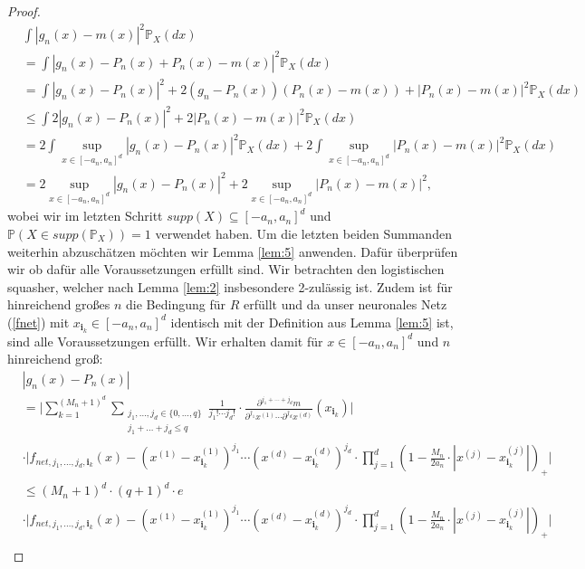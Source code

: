 \begin{proof}
\begin{equation}
\label{gnmx}
\begin{split}
& \int |g_n(x) - m(x)|^2 \mathds{P}_X(dx) \\
& = \int |g_n(x) - P_n(x) + P_n(x) - m(x)|^2 \mathds{P}_X(dx) \\
& = \int |g_n(x) - P_n(x)|^2 + 2(g_n - P_n(x))(P_n(x) - m(x)) + |P_n(x) - m(x)|^2 \mathds{P}_X(dx) \\
& \leq \int 2 |g_n(x) - P_n(x)|^2 + 2 |P_n(x) - m(x)|^2 \mathds{P}_X(dx) \\
& = 2 \int \sup_{x \in [-a_n, a_n]^d} |g_n(x) - P_n(x)|^2 \mathds{P}_X(dx) + 2 \int \sup_{x \in [-a_n, a_n]^d} |P_n(x) - m(x)|^2 \mathds{P}_X(dx) \\
& = 2 \sup_{x \in [-a_n, a_n]^d} |g_n(x) - P_n(x)|^2 + 2 \sup_{x \in [-a_n, a_n]^d} |P_n(x) - m(x)|^2, 
\end{split}
\end{equation}
wobei wir im letzten Schritt $supp(X) \subseteq [-a_n, a_n]^d$ und $\mathds{P}(X \in supp(\mathds{P}_X)) = 1$ verwendet haben. Um die letzten beiden Summanden weiterhin abzuschätzen möchten wir Lemma \ref{lem:5} anwenden. Dafür überprüfen wir ob dafür alle Voraussetzungen erfüllt sind. Wir betrachten den logistischen squasher, welcher nach Lemma \ref{lem:2} insbesondere 2-zulässig ist. Zudem ist für hinreichend großes $n$ die Bedingung für $R$ erfüllt und da unser neuronales Netz (\ref{fnet}) mit $x_{\mathbf{i}_k} \in [-a_n, a_n]^d$ identisch mit der Definition aus Lemma \ref{lem:5} ist, sind alle Voraussetzungen erfüllt. 
Wir erhalten damit für $x \in [-a_n ,a_n]^d$ und $n$ hinreichend groß:
\begin{equation}
\label{1stsum}
\begin{split}
& |g_n(x) - P_n(x)| \\
& = \bigg| \sum_{k = 1}^{(M_n + 1)^d} \sum_{\substack{ j_1,\dots,j_d \in \{0,\dots,q\} \\j_1+\dots +j_d \leq q}} \frac{1}{j_1! \cdots j_d!} \cdot \frac{\partial^{j_1+\cdots + j_d} m}{\partial^{j_1} x^{(1)}\cdots \partial^{j_d} x^{(d)}}(x_{\mathbf{i}_k}) \bigg| \\
& \cdot \bigg| f_{net,j_1,\dots,j_d,\mathbf{i}_k}(x) - (x^{(1)} - x_{\mathbf{i}_k}^{(1)})^{j_1} \cdots (x^{(d)} - x_{\mathbf{i}_k}^{(d)})^{j_d} \cdot \prod_{j = 1}^d(1 - \frac{M_n}{2a_n} \cdot |x^{(j)} - x_{\mathbf{i}_k}^{(j)}|)_+ \bigg| \\
& \leq (M_n + 1)^d \cdot (q + 1)^d \cdot e \\
& \cdot  \bigg| f_{net,j_1,\dots,j_d,\mathbf{i}_k}(x) - (x^{(1)} - x_{\mathbf{i}_k}^{(1)})^{j_1} \cdots (x^{(d)} - x_{\mathbf{i}_k}^{(d)})^{j_d} \cdot \prod_{j = 1}^d(1 - \frac{M_n}{2a_n} \cdot |x^{(j)} - x_{\mathbf{i}_k}^{(j)}|)_+ \bigg| \\

\end{split}
\end{equation}
\end{proof}
